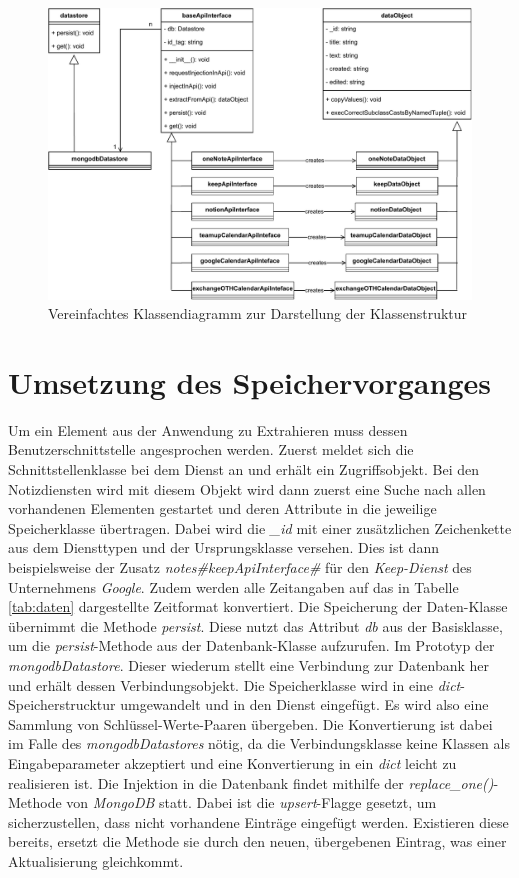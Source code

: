 \begin{figure}[H]
	\centering
	\includegraphics[width=1\textwidth]{Bilder/umsetzung/classDiagramm.pdf}
	\caption{Vereinfachtes Klassendiagramm zur Darstellung der Klassenstruktur}
	\label{fig:Klassendiagram}
\end{figure}

\section{Umsetzung des Speichervorganges}

Um ein Element aus der Anwendung zu Extrahieren muss dessen Benutzerschnittstelle angesprochen werden. Zuerst meldet sich die Schnittstellenklasse bei dem Dienst an und erhält ein Zugriffsobjekt. Bei den Notizdiensten wird mit diesem Objekt wird dann zuerst eine Suche nach allen vorhandenen Elementen gestartet und deren Attribute in die jeweilige Speicherklasse übertragen. Dabei wird die \textit{\_id} mit einer zusätzlichen Zeichenkette aus dem Diensttypen und der Ursprungsklasse versehen. Dies ist dann beispielsweise der Zusatz \textit{notes\#keepApiInterface\#} für den \textit{Keep-Dienst} des Unternehmens \textit{Google}. Zudem werden alle Zeitangaben auf das in Tabelle \ref{tab:daten} dargestellte Zeitformat konvertiert. Die Speicherung der Daten-Klasse übernimmt die Methode \textit{persist}. Diese nutzt das Attribut \textit{db} aus der Basisklasse, um die \textit{persist}-Methode aus der Datenbank-Klasse aufzurufen. Im Prototyp der \textit{mongodbDatastore}. Dieser wiederum stellt eine Verbindung zur Datenbank her und erhält dessen Verbindungsobjekt. Die Speicherklasse wird in eine \textit{dict}-Speicherstrucktur umgewandelt und in den Dienst eingefügt. Es wird also eine Sammlung von Schlüssel-Werte-Paaren übergeben. Die Konvertierung ist dabei im Falle des \textit{mongodbDatastores} nötig, da die Verbindungsklasse keine Klassen als Eingabeparameter akzeptiert und eine Konvertierung in ein \textit{dict} leicht zu realisieren ist. Die Injektion in die Datenbank findet mithilfe der \textit{replace\_one()}-Methode von \textit{MongoDB} statt. Dabei ist die \textit{upsert}-Flagge gesetzt, um sicherzustellen, dass nicht vorhandene Einträge eingefügt werden. Existieren diese bereits, ersetzt die Methode sie durch den neuen, übergebenen Eintrag, was einer Aktualisierung gleichkommt.


